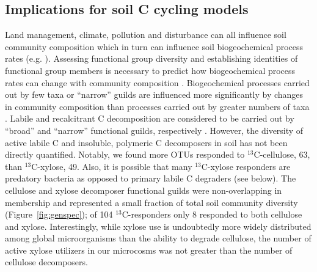 \subsection{Implications for soil C cycling models}
Land management, climate, pollution and disturbance can all influence soil
community composition \citep{McGuire2010} which in turn can influence soil
biogeochemical process rates (e.g. \citep{Berlemont2014a}). Assessing
functional group diversity and establishing identities of functional group
members is necessary to predict how biogeochemical process rates can change
with community composition \citep{Schimel_1995,McGuire2010}. 
Biogeochemical processes carried out by few taxa or ``narrow'' guilds are
influenced more significantly by changes in community composition than
processes carried out by greater numbers of taxa
\citep{Schimel_1995,McGuire2010}. Labile and recalcitrant C decomposition are
considered to be carried out by ``broad'' and ``narrow'' functional guilds,
respectively \citep{Schimel_1995,McGuire2010}. However, the diversity of active
labile C and insoluble, polymeric C decomposers in soil has not been directly
quantified. Notably, we found more OTUs responded to $^{13}$C-cellulose, 63,
than $^{13}$C-xylose, 49. Also, it is possible that many $^{13}$C-xylose
responders are predatory bacteria as opposed to primary labile C degraders (see
below). The cellulose and xylose decomposer functional guilds were
non-overlapping in membership and represented a small fraction of total soil
community diversity (Figure~\ref{fig:genspec}); of 104 $^{13}$C-responders only
8 responded to both cellulose and xylose. Interestingly, while xylose use is
undoubtedly more widely distributed among global microorganisms than the
ability to degrade cellulose, the number of active xylose utilizers in our
microcosms was not greater than the number of cellulose decomposers.

